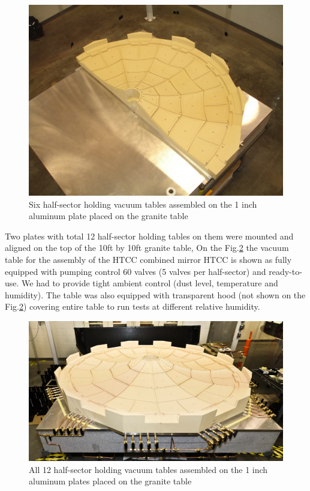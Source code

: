 \begin{figure}[h]
    \centering
    \includegraphics[width=1.0\linewidth]{images/Six_Foam_Vacuum_Tables.jpg}
    \caption{Six half-sector holding vacuum tables assembled on the 1 inch aluminum plate placed on the granite table}
    \label{fig:Six_Foam_Vacuum_Tables}
\end{figure}

\indent Two plates with total 12 half-sector holding tables on them were mounted and aligned on the top of the 10ft by 10ft granite table, On the Fig.\ref{fig:Twelve_Foam_Vacuum_Tables} the vacuum table for the assembly of the HTCC combined mirror HTCC is shown as fully equipped with pumping control 60 valves (5 valves per half-sector) and ready-to-use. We had to provide tight ambient control (dust level, temperature and humidity). The table was also equipped with transparent hood (not shown on the Fig.\ref{fig:Twelve_Foam_Vacuum_Tables}) covering entire table to run tests at different relative humidity.   

\begin{figure}[h]
    \centering
    \includegraphics[width=1.0\linewidth]{images/Twelve_Foam_Vacuum_Tables.jpg}
    \caption{All 12 half-sector holding vacuum tables assembled on the 1 inch aluminum plates placed on the granite table}
    \label{fig:Twelve_Foam_Vacuum_Tables}
\end{figure}

